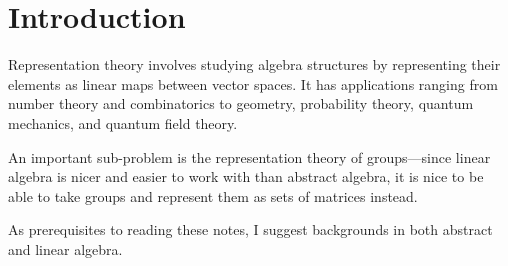 \chapter{Introduction}

Representation theory involves studying algebra structures by representing their elements as linear maps between vector spaces. It has applications ranging from number theory and combinatorics to geometry, probability theory, quantum mechanics, and quantum field theory.

An important sub-problem is the representation theory of groups---since linear algebra is nicer and easier to work with than abstract algebra, it is nice to be able to take groups and represent them as sets of matrices instead.

As prerequisites to reading these notes, I suggest backgrounds in both abstract and linear algebra. 